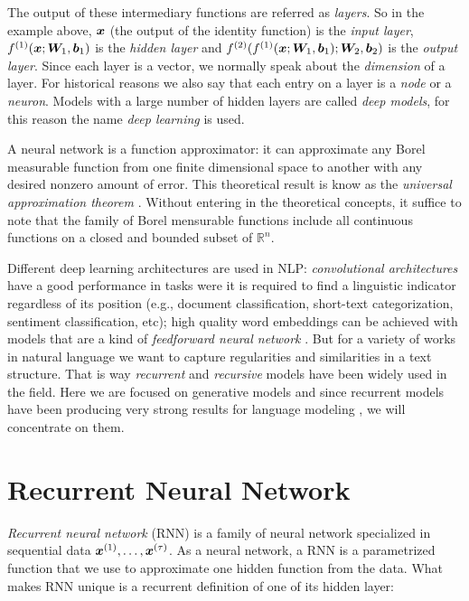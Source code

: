 The output of these intermediary functions are referred as \textit{layers}. So in the example above, $\bm{x}$ (the output of the identity function) is the \textit{input layer}, $f^{(1)}(\bm{x}; \bm{W}_1, \bm{b}_1)$ is the \textit{hidden layer} and $f^{(2)}(f^{(1)}(\bm{x}; \bm{W}_1, \bm{b}_1); \bm{W}_2, \bm{b}_2)$ is the \textit{output layer}. Since each layer is a vector, we normally speak about the \textit{dimension} of a layer. For historical reasons we also say that each entry on a layer is a \textit{node} or a \textit{neuron}.  Models with a large number of hidden layers are called \textit{deep models}, for this reason the name \textit{deep learning} is used.  

\par A neural network is a function approximator: it can approximate any Borel measurable function from one finite dimensional space to another with any desired nonzero amount of error. This theoretical result is know as the \textit{universal approximation theorem} \cite{Cybenko}. Without entering in the theoretical concepts, it suffice to note that the family of Borel mensurable functions include all continuous functions on a closed and bounded subset of $\mathbb{R}^n$.



Different deep learning architectures are used in NLP: \textit{convolutional architectures} have a good performance in tasks were it is required to find a linguistic indicator regardless of its position (e.g., document classification, short-text categorization, sentiment classification, etc); high quality word embeddings can be achieved with models that are a kind of \textit{feedforward neural network} \cite{Mikolov23}. But for a variety of works in natural language we want to capture regularities and similarities in a text structure. That is way \textit{recurrent} and \textit{recursive} models have been widely used in the field. Here we are focused on generative models and since recurrent models have been producing very strong results for language modeling \cite{goldberg15}, we will concentrate on them.


\section{Recurrent Neural Network}
\label{sec:RNN}


\textit{Recurrent neural network} (RNN) is a family of neural network specialized in sequential data $\bm{x}^{(1)}, \dots, \bm{x}^{(\tau)}$. As a neural network, a RNN is a parametrized function that we use to approximate one hidden function from the data. What makes RNN unique is a recurrent definition of one of its hidden layer:

